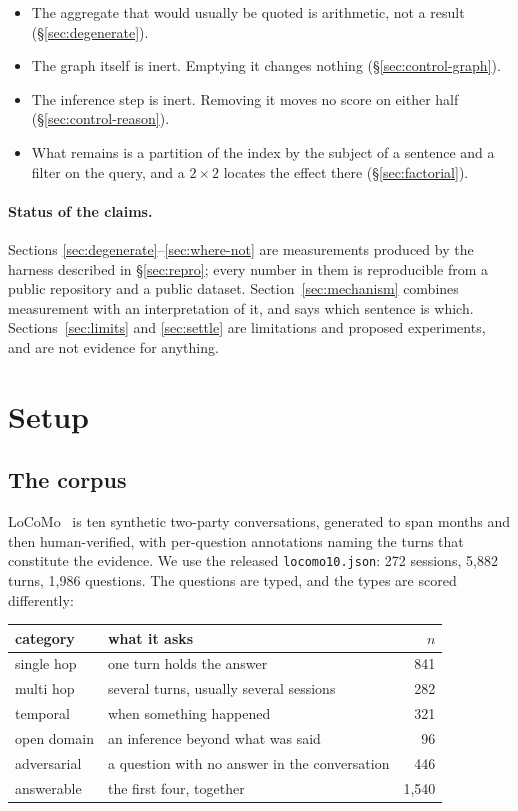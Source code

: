\documentclass[11pt]{article}
\begin{document}
\begin{itemize}[leftmargin=1.2em,itemsep=2pt]
\item The aggregate that would usually be quoted is arithmetic, not a result
      (\S\ref{sec:degenerate}).
\item The graph itself is inert. Emptying it changes nothing
      (\S\ref{sec:control-graph}).
\item The inference step is inert. Removing it moves no score on either half
      (\S\ref{sec:control-reason}).
\item What remains is a partition of the index by the subject of a sentence and
      a filter on the query, and a $2\times2$ locates the effect there
      (\S\ref{sec:factorial}).
\end{itemize}

\paragraph{Status of the claims.} Sections
\ref{sec:degenerate}--\ref{sec:where-not} are measurements produced by the
harness described in \S\ref{sec:repro}; every number in them is reproducible
from a public repository and a public dataset. Section~\ref{sec:mechanism}
combines measurement with an interpretation of it, and says which sentence is
which. Sections~\ref{sec:limits} and \ref{sec:settle} are limitations and
proposed experiments, and are not evidence for anything.

\section{Setup}
\label{sec:setup}

\subsection{The corpus}

LoCoMo~\cite{locomo} is ten synthetic two-party conversations, generated to
span months and then human-verified, with per-question annotations naming the
turns that constitute the evidence. We use the released \texttt{locomo10.json}:
272 sessions, 5{,}882 turns, 1{,}986 questions. The questions are typed, and the
types are scored differently:

\begin{center}
\small
\begin{tabular}{@{}llr@{}}
\toprule
category & what it asks & $n$ \\
\midrule
single hop  & one turn holds the answer              & 841 \\
multi hop   & several turns, usually several sessions & 282 \\
temporal    & when something happened                 & 321 \\
open domain & an inference beyond what was said       & 96 \\
adversarial & a question with no answer in the conversation & 446 \\
\midrule
answerable  & the first four, together               & 1{,}540 \\
\bottomrule
\end{tabular}
\end{center}
\end{document}
